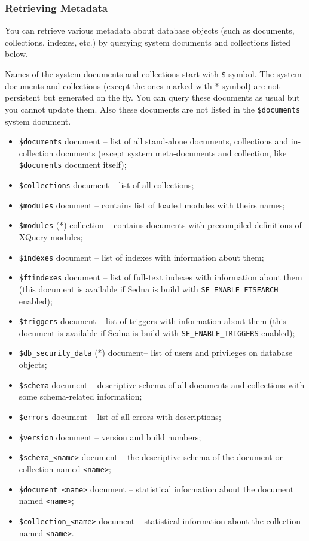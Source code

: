 \documentclass[a4paper,12pt]{article}
\newenvironment{citemize}
{\begin{itemize}
  \setlength{\itemsep}{0pt}
  \setlength{\parskip}{0pt}
  \setlength{\parsep}{0pt}}
{\end{itemize}}
\begin{document}
\subsubsection{Retrieving Metadata}
\label{managing-metadata}

You can retrieve various metadata about database objects (such as documents,
collections, indexes, etc.) by querying system documents and collections listed
below.

Names of the system documents and collections start with \verb!$! symbol. The
system documents and collections (except the ones marked with * symbol) are not
persistent but generated on the fly. You can query these documents as usual but
you cannot update them. Also these documents are not listed in the
\verb!$documents! system document.

\begin{citemize}
\item\verb!$documents! document -- list of all stand-alone documents,
collections and in-collection documents (except system meta-documents and
collection, like \verb!$documents! document itself);
\item\verb!$collections! document -- list of all collections;
\item\verb!$modules! document -- contains list of loaded modules with
theirs names;
\item\verb!$modules! (*) collection -- contains documents with precompiled
definitions of XQuery modules;
\item\verb!$indexes! document -- list of indexes with information about
them;
\item\verb!$ftindexes! document -- list of full-text indexes with
information about them (this document is available if Sedna is build with
\verb!SE_ENABLE_FTSEARCH! enabled);
\item\verb!$triggers! document -- list of triggers with information about
them (this document is available if Sedna is build with
\verb!SE_ENABLE_TRIGGERS! enabled);
\item\verb!$db_security_data! (*) document-- list of users and privileges on
database objects;
\item\verb!$schema! document -- descriptive schema of all documents and
collections with some schema-related information;
\item\verb!$errors! document -- list of all errors with descriptions;
\item\verb!$version! document -- version and build numbers;
\item\verb!$schema_<name>! document -- the descriptive schema of the
document or collection named \verb!<name>!;
\item\verb!$document_<name>! document -- statistical information about the
document named \verb!<name>!;
\item\verb!$collection_<name>! document -- statistical information about the
collection named \verb!<name>!.
\end{citemize}
\end{document}
